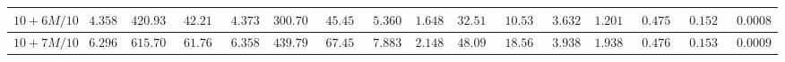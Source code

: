 \begin{landscape}
\begin{tabular}{|c|c|c|c|c|c|c|c|c|c|c|c|c|c|c|c}
$10 + 6M/10$ & $4.3580$                                                        & $420.9375$                                                      & $42.2108$                                                         & $4.3732$                                                           & $300.7061$                                                            & $45.4542$                                                       & $5.3607$                                                          & $1.6485$                                                           & $32.5163$                                                             & $10.5327$                                                       & $3.6324$                                                          & $1.20113$                                                        & $0.47511$                                                          & $0.15287$                                                           & \multicolumn{1}{c|}{$0.0008$}                                                              \\ \hline
$10 + 7M/10$ & $6.2966$                                                        & $615.7032$                                                      & $61.7642$                                                         & $6.3582$                                                           & $439.7957$                                                            & $67.4558$                                                       & $7.8830$                                                          & $2.1481$                                                           & $48.0950$                                                             & $18.5646$                                                       & $3.9386$                                                          & $1.93877$                                                        & $0.47694$                                                          & $0.1530$                                                           & \multicolumn{1}{c|}{$0.00093$}                                                              \\ \hline

\end{tabular}
\end{landscape}
